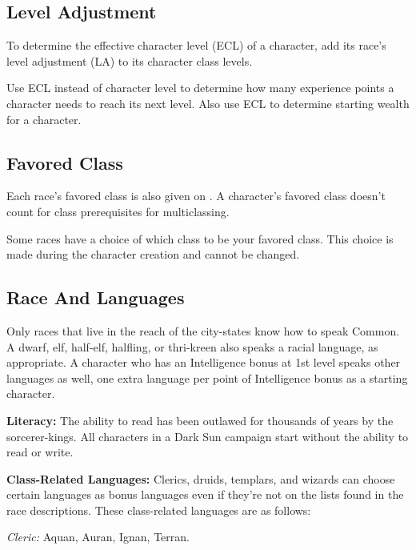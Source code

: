 \subsection{Level Adjustment}
To determine the effective character level (ECL) of a character, add its race's level adjustment (LA) to its character class levels.

Use ECL instead of character level to determine how many experience points a character needs to reach its next level. Also use ECL to determine starting wealth for a character.

\subsection{Favored Class}
Each race's favored class is also given on . A character's favored class doesn't count for class prerequisites for multiclassing. %


Some races have a choice of which class to be your favored class. This choice is made during the character creation and cannot be changed.

\subsection{Race And Languages}
Only races that live in the reach of the city-states know how to speak Common. A dwarf, elf, half-elf, halfling, or thri-kreen also speaks a racial language, as appropriate. A character who has an Intelligence bonus at 1st level speaks other languages as well, one extra language per point of Intelligence bonus as a starting character.

\textbf{Literacy:} The ability to read has been outlawed for thousands of years by the sorcerer-kings. All characters in a {\tableheader Dark Sun} campaign start without the ability to read or write.

\textbf{Class-Related Languages:} Clerics, druids, templars, and wizards can choose certain languages as bonus languages even if they're not on the lists found in the race descriptions. These class-related languages are as follows:

\textit{Cleric:} Aquan, Auran, Ignan, Terran.

